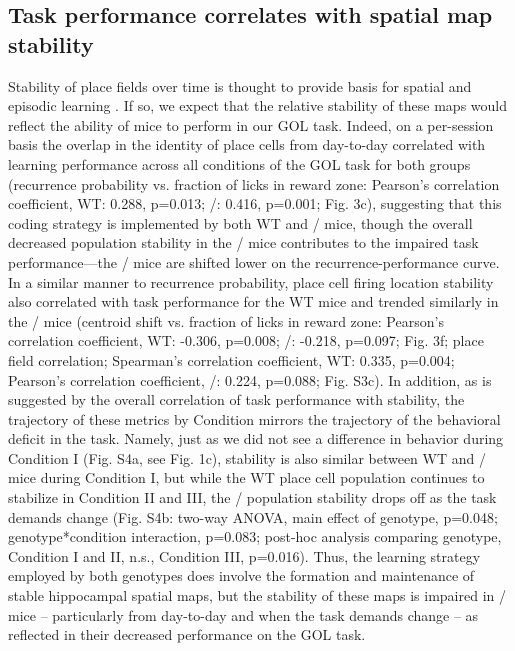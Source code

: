 \subsection{Task performance correlates with spatial map stability}

Stability of place fields over time is thought to provide basis for spatial and episodic learning \citep{Kentros2004}\citep{Mankin2012}\citep{Thompson1990}\citep{Ziv2013}. If so, we expect that the relative stability of these maps would reflect the ability of mice to perform in our GOL task. Indeed, on a per-session basis the overlap in the identity of place cells from day-to-day correlated with learning performance across all conditions of the GOL task for both groups (recurrence probability vs. fraction of licks in reward zone: Pearson’s correlation coefficient, WT: 0.288, p=0.013; \df/: 0.416, p=0.001; Fig. 3c), suggesting that this coding strategy is implemented by both WT and \df/ mice, though the overall decreased population stability in the \df/ mice contributes to the impaired task performance—the \df/  mice are shifted lower on the recurrence-performance curve. In a similar manner to recurrence probability, place cell firing location stability also correlated with task performance for the WT mice and trended similarly in the \df/ mice (centroid shift vs. fraction of licks in reward zone: Pearson’s correlation coefficient, WT: -0.306, p=0.008; \df/: -0.218, p=0.097; Fig. 3f; place field correlation; Spearman’s correlation coefficient, WT: 0.335, p=0.004; Pearson’s correlation coefficient, \df/: 0.224, p=0.088; Fig. S3c). In addition, as is suggested by the overall correlation of task performance with stability, the trajectory of these metrics by Condition mirrors the trajectory of the behavioral deficit in the task. Namely, just as we did not see a difference in behavior during Condition I (Fig. S4a, see Fig. 1c), stability is also similar between WT and \df/  mice during Condition I, but while the WT place cell population continues to stabilize in Condition II and III, the \df/ population stability drops off as the task demands change (Fig. S4b: two-way ANOVA, main effect of genotype, p=0.048; genotype*condition interaction, p=0.083; post-hoc analysis comparing genotype, Condition I and II, n.s., Condition III, p=0.016). Thus, the learning strategy employed by both genotypes does involve the formation and maintenance of stable hippocampal spatial maps, but the stability of these maps is impaired in \df/ mice – particularly from day-to-day and when the task demands change – as reflected in their decreased performance on the GOL task.

